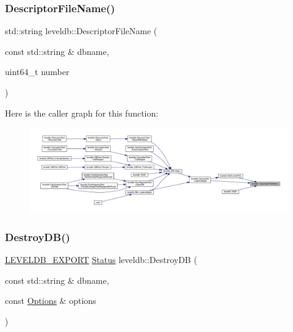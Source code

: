 \subsubsection{\texorpdfstring{DescriptorFileName()}{DescriptorFileName()}}
{\footnotesize\ttfamily std\+::string leveldb\+::\+Descriptor\+File\+Name (\begin{DoxyParamCaption}\item[{const std\+::string \&}]{dbname,  }\item[{uint64\+\_\+t}]{number }\end{DoxyParamCaption})}

Here is the caller graph for this function\+:
\nopagebreak
\begin{figure}[H]
\begin{center}
\leavevmode
\includegraphics[width=350pt]{namespaceleveldb_a1ea160b70b18dc85b537e16db3d6ddd0_icgraph}
\end{center}
\end{figure}
\mbox{\label{namespaceleveldb_aa8b29424fdd7d5113876e89682d68e6f}} 
\subsubsection{\texorpdfstring{DestroyDB()}{DestroyDB()}}
{\footnotesize\ttfamily \mbox{\hyperlink{export_8h_a658cd25b9dd114d894ae8ce9dddb7d3a}{L\+E\+V\+E\+L\+D\+B\+\_\+\+E\+X\+P\+O\+RT}} \mbox{\hyperlink{classleveldb_1_1_status}{Status}} leveldb\+::\+Destroy\+DB (\begin{DoxyParamCaption}\item[{const std\+::string \&}]{dbname,  }\item[{const \mbox{\hyperlink{structleveldb_1_1_options}{Options}} \&}]{options }\end{DoxyParamCaption})}

